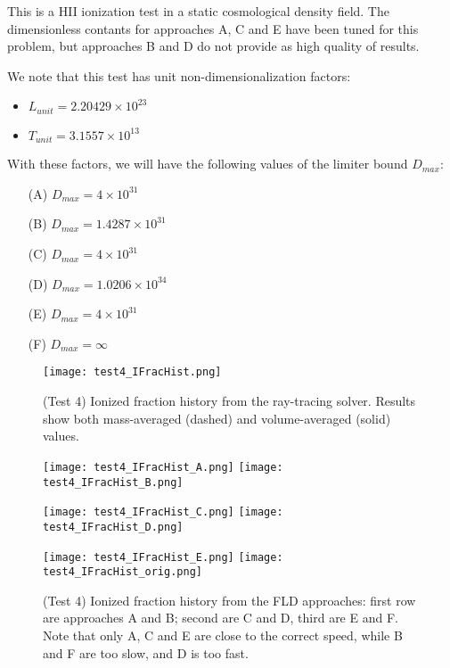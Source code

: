 \documentclass[letterpaper,11pt]{article}
\begin{document}
This is a HII ionization test in a static cosmological density
field.  The dimensionless contants for approaches A, C and E have been
tuned for this problem, but approaches B and D do not provide
as high quality of results.

We note that this test has unit non-dimensionalization factors:
\begin{itemize}
\item $L_{unit} = 2.20429\times10^{23}$
\item $T_{unit} = 3.1557\times10^{13}$
\end{itemize}
With these factors, we will have the following values of the limiter
bound $D_{max}$:
\begin{itemize}
\item[(A)] $D_{max} = 4\times10^{31}$
\item[(B)] $D_{max} = 1.4287\times10^{31}$
\item[(C)] $D_{max} = 4\times10^{31}$
\item[(D)] $D_{max} = 1.0206\times10^{34}$
\item[(E)] $D_{max} = 4\times10^{31}$
\item[(F)] $D_{max} = \infty$
\end{itemize}


\begin{figure}[t]
  \centerline{
  \texttt{[image: test4\_IFracHist.png]}
  }
  \caption{(Test 4) Ionized fraction history from the ray-tracing
    solver.  Results show both mass-averaged (dashed) and
    volume-averaged (solid) values.}
  \label{fig:test4_IFrac_RT}
\end{figure}

\begin{figure}[t]
  \centerline{\hfill
  \texttt{[image: test4\_IFracHist\_A.png]}
  \texttt{[image: test4\_IFracHist\_B.png]}
  \hfill}
  \centerline{\hfill
  \texttt{[image: test4\_IFracHist\_C.png]}
  \texttt{[image: test4\_IFracHist\_D.png]}
  \hfill}
  \centerline{\hfill
  \texttt{[image: test4\_IFracHist\_E.png]}
  \texttt{[image: test4\_IFracHist\_orig.png]}
  \hfill}
  \caption{(Test 4) Ionized fraction history from the FLD approaches:
    first row are approaches A and B; second are C and D, third are E
    and F. Note that only A, C and E are close to the correct speed,
    while B and F are too slow, and D is too fast.} 
  \label{fig:test4_IFrac}
\end{figure}
\end{document}
